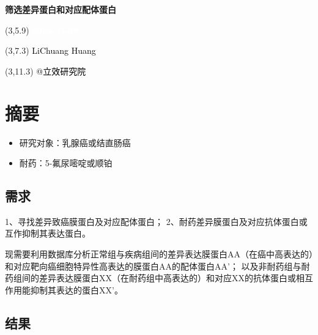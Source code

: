 \documentclass[
]{article}
\author{}
\date{\vspace{-2.5em}}
\providecommand{\tightlist}{%
  \setlength{\itemsep}{0pt}\setlength{\parskip}{0pt}}
\begin{document}
\begin{titlepage} 
\begin{center} \textbf{\Huge
筛选差异蛋白和对应配体蛋白} \vspace{4em}
\begin{textblock}{10}(3,5.9) \huge
\textbf{\textcolor{white}{2024-03-08}}
\end{textblock} \begin{textblock}{10}(3,7.3)
\Large \textcolor{black}{LiChuang Huang}
\end{textblock} \begin{textblock}{10}(3,11.3)
\Large \textcolor{black}{@立效研究院}
\end{textblock} \end{center} \end{titlepage}
\restoregeometry


\tableofcontents

\listoffigures

\listoftables

\newpage


\hypertarget{abstract}{%
\section{摘要}\label{abstract}}

\begin{itemize}
\tightlist
\item
  研究对象：乳腺癌或结直肠癌
\item
  耐药：5-氟尿嘧啶或顺铂
\end{itemize}

\hypertarget{ux9700ux6c42}{%
\subsection{需求}\label{ux9700ux6c42}}

1、寻找差异致癌膜蛋白及对应配体蛋白；
2、耐药差异膜蛋白及对应抗体蛋白或互作抑制其表达蛋白。

现需要利用数据库分析正常组与疾病组间的差异表达膜蛋白AA（在癌中高表达的）和对应靶向癌细胞特异性高表达的膜蛋白AA的配体蛋白AA'；
以及非耐药组与耐药组间的差异表达膜蛋白XX（在耐药组中高表达的）和对应XX的抗体蛋白或相互作用能抑制其表达的蛋白XX'。

\hypertarget{ux7ed3ux679c}{%
\subsection{结果}\label{ux7ed3ux679c}}
\end{document}

